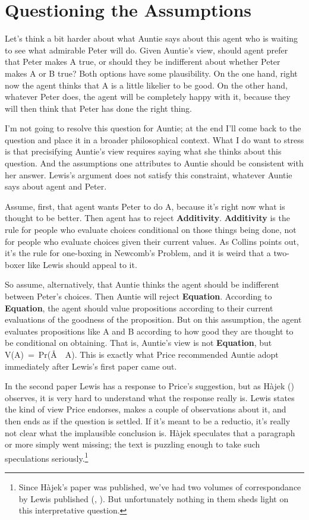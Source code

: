 \documentclass[
  11pt,
  letterpaper,
  DIV=11,
  numbers=noendperiod,
  twoside]{scrartcl}
\begin{document}
\section{Questioning the Assumptions}\label{questioning-the-assumptions}

Let's think a bit harder about what Auntie says about this agent who is
waiting to see what admirable Peter will do. Given Auntie's view, should
agent prefer that Peter makes A true, or should they be indifferent
about whether Peter makes A or B true? Both options have some
plausibility. On the one hand, right now the agent thinks that A is a
little likelier to be good. On the other hand, whatever Peter does, the
agent will be completely happy with it, because they will then think
that Peter has done the right thing.

I'm not going to resolve this question for Auntie; at the end I'll come
back to the question and place it in a broader philosophical context.
What I do want to stress is that precisifying Auntie's view requires
saying what she thinks about this question. And the assumptions one
attributes to Auntie should be consistent with her answer. Lewis's
argument does not satisfy this constraint, whatever Auntie says about
agent and Peter.

Assume, first, that agent wants Peter to do A, because it's right now
what is thought to be better. Then agent has to reject
\textbf{Additivity}. \textbf{Additivity} is the rule for people who
evaluate choices conditional on those things being done, not for people
who evaluate choices given their current values. As Collins points out,
it's the rule for one-boxing in Newcomb's Problem, and it is weird that
a two-boxer like Lewis should appeal to it.

So assume, alternatively, that Auntie thinks the agent should be
indifferent between Peter's choices. Then Auntie will reject
\textbf{Equation}. According to \textbf{Equation}, the agent should
value propositions according to their current evaluations of the
goodness of the proposition. But on this assumption, the agent evaluates
propositions like A and B according to how good they are thought to be
conditional on obtaining. That is, Auntie's view is not
\textbf{Equation}, but V(A)~=~Pr(Å~\textbar~A). This is exactly what
Price recommended Auntie adopt immediately after Lewis's first paper
came out.

In the second paper Lewis has a response to Price's suggestion, but as
Hàjek () observes, it is very hard to
understand what the response really is. Lewis states the kind of view
Price endorses, makes a couple of observations about it, and then ends
as if the question is settled. If it's meant to be a reductio, it's
really not clear what the implausible conclusion is. Hàjek speculates
that a paragraph or more simply went missing; the text is puzzling
enough to take such speculations seriously.\footnote{Since Hàjek's paper
  was published, we've had two volumes of correspondance by Lewis
  published (,
  ). But unfortunately nothing in
  them sheds light on this interpretative question.}
\end{document}

